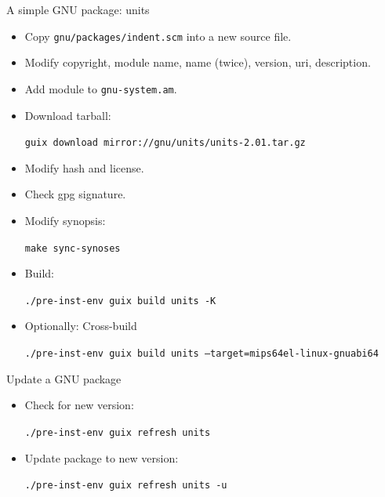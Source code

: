 \documentclass [t]{beamer}
\begin{document}
\begin {frame}{A simple GNU package: units}
\begin {itemize}
\item
\textcolor {blau}{Copy} \texttt {gnu/packages/indent.scm} into
a new source file.
\pause
\item
Modify \textcolor {blau}{copyright},
\textcolor {blau}{module name},
\textcolor {blau}{name} (twice),
\textcolor {blau}{version},
\textcolor {blau}{uri},
\textcolor {blau}{description}.
\item
Add module to \textcolor {blau}{\texttt {gnu-system.am}}.
\pause
\item
\textcolor {blau}{Download} tarball:

\texttt{guix download mirror://gnu/units/units-2.01.tar.gz}
\pause
\item
Modify \textcolor {blau}{hash} and \textcolor {blau}{license}.
\pause
\item
\textcolor {blau}{Check gpg signature.}
\pause
\item
Modify \textcolor {blau}{synopsis}:

\texttt {make sync-synoses}
\pause
\item
\textcolor {blau}{Build}:

\texttt {./pre-inst-env guix build units -K}
\pause
\item
Optionally: Cross-build

\texttt {./pre-inst-env guix build units --target=mips64el-linux-gnuabi64}
\end {itemize}
\end {frame}


\begin {frame}{Update a GNU package}
\begin {itemize}
\item
\textcolor {blau}{Check} for new version:

\texttt {./pre-inst-env guix refresh units}
\item
\textcolor {blau}{Update} package to new version:

\texttt {./pre-inst-env guix refresh units -u}
\end {itemize}
\end {frame}
\end{document}
